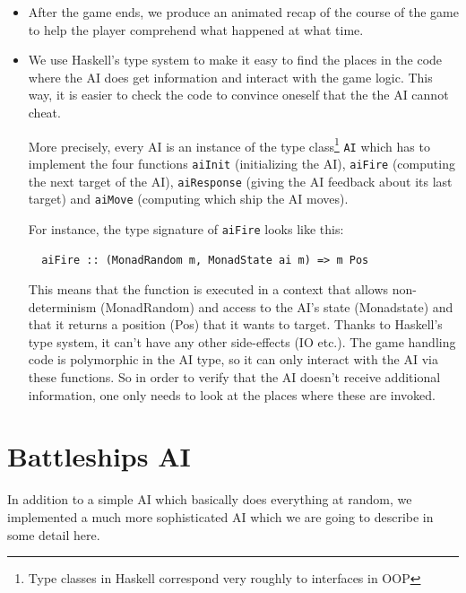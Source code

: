\documentclass[a4paper]{easychair}
\begin{document}
\begin{itemize}
 \item After the game ends, we produce an animated recap of the course of the game to help the player comprehend what happened at what time. 
 \item We use Haskell's type system to make it easy to find the places in the code where the AI does get information and interact with the game logic. This way, it is easier to check the code to convince oneself that the the AI cannot cheat.
 

 More precisely, every AI is an instance of the type class\footnote{Type classes in Haskell correspond very roughly to interfaces in OOP} \verb+AI+ which has to implement the four functions \verb+aiInit+ (initializing the AI), \verb+aiFire+ (computing the next target of the AI), \verb+aiResponse+ (giving the AI feedback about its last target) and \verb+aiMove+ (computing which ship the AI moves).
 
 For instance, the type signature of \verb+aiFire+ looks like this:
 \begin{verbatim}
  aiFire :: (MonadRandom m, MonadState ai m) => m Pos
 \end{verbatim}
 This means that the function is executed in a context that allows non-determinism (MonadRandom) and access to the AI's state (Monadstate) and that it returns a position (Pos) that it wants to target. Thanks to Haskell's type system, it can't have any other side-effects (IO etc.). The game handling code is polymorphic in the AI type, so it can only interact with the AI via these functions. So in order to verify that the AI doesn't receive additional information, one only needs to look at the places where these are invoked.

\end{itemize}

\section{Battleships AI}
\label{sect:battleships-ai}
In addition to a simple AI which basically does everything at random, we implemented a much more sophisticated AI which we are going to describe in some detail here.
\end{document}
